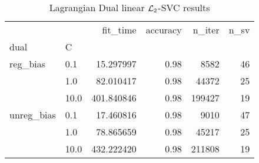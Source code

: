 \begin{table}[H]
\centering
\caption{Lagrangian Dual linear $\protect \mathcal{L}_2$-SVC results}
\label{linear_lagrangian_dual_l2_svc_cv_results}
\begin{tabular}{llrrrr}
\toprule
           &      &    fit\_time &  accuracy &  n\_iter &  n\_sv \\
dual & C &             &           &         &       \\
\midrule
reg\_bias & 0.1  &   15.297997 &      0.98 &    8582 &    46 \\
           & 1.0  &   82.010417 &      0.98 &   44372 &    25 \\
           & 10.0 &  401.840846 &      0.98 &  199427 &    19 \\
unreg\_bias & 0.1  &   17.460816 &      0.98 &    9010 &    47 \\
           & 1.0  &   78.865659 &      0.98 &   45217 &    25 \\
           & 10.0 &  432.222420 &      0.98 &  211808 &    19 \\
\bottomrule
\end{tabular}
\end{table}
